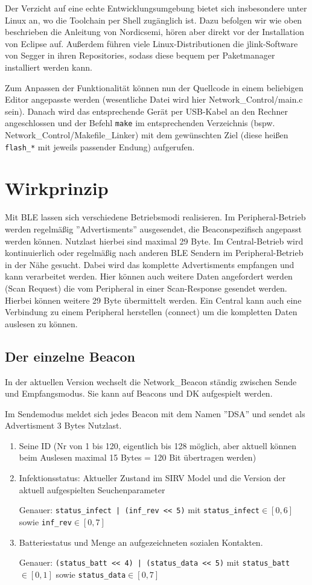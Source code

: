 \documentclass[11pt,ngerman]{scrartcl} %
\begin{document}
Der Verzicht auf eine echte Entwicklungsumgebung bietet sich insbesondere unter Linux an, wo die Toolchain per Shell zugänglich ist. Dazu befolgen wir wie oben beschrieben die Anleitung von Nordicsemi, hören aber direkt vor der Installation von Eclipse auf. Außerdem führen viele Linux-Distributionen die jlink-Software von Segger in ihren Repositories, sodass diese bequem per Paketmanager installiert werden kann.

Zum Anpassen der Funktionalität können nun der Quellcode in einem beliebigen Editor angepasste werden (wesentliche Datei wird hier Network\_Control/main.c sein). Danach wird das entsprechende Gerät per USB-Kabel an den Rechner angeschlossen und der Befehl \verb|make| im entsprechenden Verzeichnis (bspw. Network\_Control/Makefile\_Linker) mit dem gewünschten Ziel (diese heißen \verb|flash_*| mit jeweils passender Endung) aufgerufen.

\section{Wirkprinzip}
Mit BLE lassen sich verschiedene Betriebsmodi realisieren. Im Peripheral-Betrieb werden regelmäßig ''Advertisments'' ausgesendet, die Beaconspezifisch angepasst werden können. Nutzlast hierbei sind maximal 29 Byte. Im Central-Betrieb wird kontinuierlich oder regelmäßig nach anderen BLE Sendern im Peripheral-Betrieb in der Nähe gesucht. Dabei wird das komplette Advertisments empfangen und kann verarbeitet werden. Hier können auch weitere Daten angefordert werden (Scan Request) die vom Peripheral in einer Scan-Response gesendet werden. Hierbei können weitere 29 Byte übermittelt werden. Ein Central kann auch eine Verbindung zu einem Peripheral herstellen  (connect) um die kompletten Daten auslesen zu können.


\subsection{Der einzelne Beacon}

In der aktuellen Version wechselt die Network\_Beacon ständig zwischen Sende und Empfangsmodus. Sie kann auf Beacons und DK aufgespielt werden.

Im Sendemodus  meldet sich jedes Beacon mit dem Namen ''DSA'' und sendet als Advertisment 3 Bytes Nutzlast. 
\begin{enumerate}
\item Seine ID (Nr von 1 bis 120, eigentlich bis 128 möglich, aber aktuell können beim Auslesen maximal 15 Bytes = 120 Bit übertragen werden)
\item Infektionsstatus: Aktueller Zustand im SIRV Model und die Version der aktuell aufgespielten Seuchenparameter

  Genauer: \verb!status_infect | (inf_rev << 5)! mit \verb!status_infect!$\in [0,6]$ sowie \verb!inf_rev!$\in [0,7]$
\item Batteriestatus und Menge an aufgezeichneten sozialen Kontakten.

  Genauer: \verb!(status_batt << 4) | (status_data << 5)! mit \verb!status_batt!$\in [0,1]$ sowie \verb!status_data!$\in [0,7]$
\end{enumerate}
\end{document}
